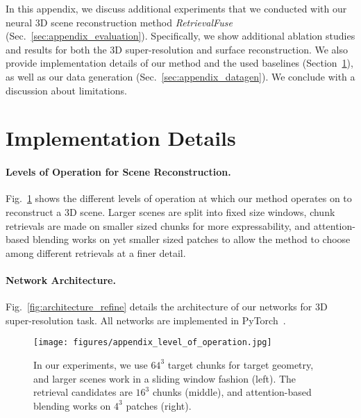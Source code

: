 %
In this appendix, we discuss additional experiments that we conducted with our neural 3D scene reconstruction method \textit{RetrievalFuse} (Sec.~\ref{sec:appendix_evaluation}).
%
Specifically, we show additional ablation studies and results for both the 3D super-resolution and surface reconstruction.
%
We also provide implementation details of our method and the used baselines (Section~\ref{sec:appendix_impl}), as well as our data generation (Sec.~\ref{sec:appendix_datagen}).
%
We conclude with a discussion about limitations.

\section{Implementation Details}
\label{sec:appendix_impl}

\paragraph{Levels of Operation for Scene Reconstruction.}
Fig.~\ref{fig:level_of_operation} shows the different levels of operation at which our method operates on to reconstruct a 3D scene. 
Larger scenes are split into fixed size windows, chunk retrievals are made on smaller sized chunks for more expressability, and attention-based blending works on yet smaller sized patches to allow the method to choose among different retrievals at a finer detail. 

\paragraph{Network Architecture.}
Fig.~\ref{fig:architecture_refine} details the architecture of our networks for 3D super-resolution task. All networks are implemented in PyTorch~\cite{NEURIPS2019_9015}.


\begin{figure}[b!]
	\centering
	\texttt{[image: figures/appendix\_level\_of\_operation.jpg]}
	\caption{In our experiments, we use $64^3$ target chunks for target geometry, and larger scenes work in a sliding window fashion (left). The retrieval candidates are $16^3$ chunks (middle), and attention-based blending works on $4^3$ patches (right).}
	\label{fig:level_of_operation}
\end{figure}



